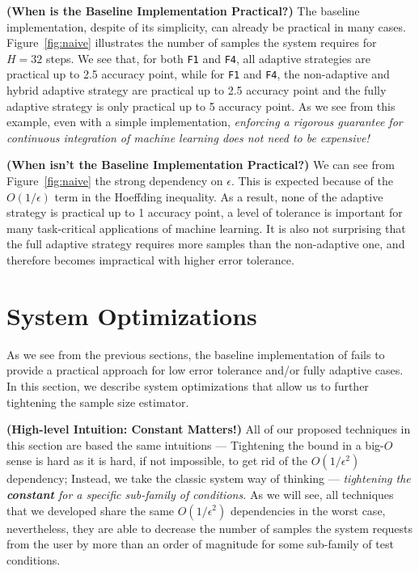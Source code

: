 \documentclass{article}
\begin{document}
\vspace{1em}
\noindent 
{\bf (When is the Baseline Implementation Practical?)}
The baseline implementation, despite of its simplicity, can
already be practical in many cases. Figure~\ref{fig:naive}
illustrates the number of samples the system requires
for $H=32$ steps. We see that, for both \texttt{F1}
and \texttt{F4}, all adaptive strategies are 
practical up to 2.5 accuracy point, while for
\texttt{F1} and \texttt{F4}, the non-adaptive and
hybrid adaptive strategy are practical up to 2.5 
accuracy point and the fully adaptive strategy
is only practical up to 5 accuracy point.
As we see from this example, even with a simple 
implementation, {\em enforcing a rigorous guarantee
for continuous integration of machine learning 
does not need to be expensive!}

\vspace{1em}
\noindent 
{\bf (When isn't the Baseline Implementation Practical?)}
We can see from Figure~\ref{fig:naive} the strong dependency
on $\epsilon$. This is expected because of the
$O(1/\epsilon)$ term in the Hoeffding inequality.
As a result, none of the adaptive strategy is
practical up to 1 accuracy point, a level of 
tolerance is important for many task-critical 
applications of machine learning. It is also not 
surprising that the full adaptive strategy requires
more samples than the non-adaptive one, and therefore
becomes impractical with higher error tolerance.

\section{System Optimizations}

As we see from the previous sections, the baseline
implementation of \sys fails to provide a practical
approach for low error tolerance and/or fully adaptive
cases. In this section, we describe system optimizations
that allow us to further tightening the sample size estimator.

\vspace{1em}
\noindent
{\bf (High-level Intuition: Constant Matters!)} All of
our proposed techniques in this section are based the
same intuitions --- Tightening the bound in a big-$O$
sense is hard as it is hard, if not impossible, to get rid 
of the $O(1/\epsilon^2)$ dependency; Instead, we take 
the classic system way of thinking --- {\em tightening
the {\bf constant} for a specific sub-family of conditions.}
As we will see, all techniques that we developed share the
same $O(1/\epsilon^2)$ dependencies in the worst case, 
nevertheless, they are able to decrease the number of
samples the system requests from the user by more than 
an order of magnitude for some sub-family of test conditions.
\end{document}

